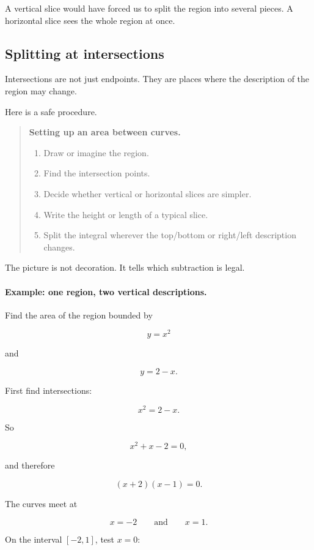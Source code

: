 A vertical slice would have forced us to split the region into several pieces.  A horizontal
slice sees the whole region at once.

\subsection{Splitting at intersections}
\label{subsec:splitting-at-intersections}

Intersections are not just endpoints.  They are places where the description of the
region may change.

Here is a safe procedure.

\begin{quote}
\textbf{Setting up an area between curves.}

\begin{enumerate}
\item Draw or imagine the region.
\item Find the intersection points.
\item Decide whether vertical or horizontal slices are simpler.
\item Write the height or length of a typical slice.
\item Split the integral wherever the top/bottom or right/left description changes.
\end{enumerate}
\end{quote}

The picture is not decoration.  It tells which subtraction is legal.

\paragraph{Example: one region, two vertical descriptions.}
Find the area of the region bounded by

\[
y=x^2
\]

and

\[
y=2-x.
\]

First find intersections:

\[
x^2=2-x.
\]

So

\[
x^2+x-2=0,
\]

and therefore

\[
(x+2)(x-1)=0.
\]

The curves meet at

\[
x=-2
\qquad\text{and}\qquad
x=1.
\]

On the interval \([-2,1]\), test \(x=0\):

